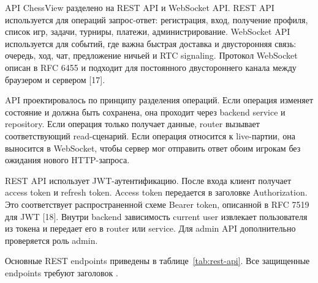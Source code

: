 API ChessView разделено на REST API и WebSocket API. REST API используется для операций запрос-ответ: регистрация, вход, получение профиля, список игр, задачи, турниры, платежи, администрирование. WebSocket API используется для событий, где важна быстрая доставка и двусторонняя связь: очередь, ход, чат, предложение ничьей и RTC signaling. Протокол WebSocket описан в RFC 6455 и подходит для постоянного двустороннего канала между браузером и сервером [17].



API проектировалось по принципу разделения операций. Если операция изменяет состояние и должна быть сохранена, она проходит через backend service и repository. Если операция только получает данные, router вызывает соответствующий read-сценарий. Если операция относится к live-партии, она выносится в WebSocket, чтобы сервер мог отправить ответ обоим игрокам без ожидания нового HTTP-запроса.

REST API использует JWT-аутентификацию. После входа клиент получает access token и refresh token. Access token передается в заголовке Authorization. Это соответствует распространенной схеме Bearer token, описанной в RFC 7519 для JWT [18]. Внутри backend зависимость current user извлекает пользователя из токена и передает его в router или service. Для admin API дополнительно проверяется роль admin.

Основные REST endpoints приведены в таблице~\ref{tab:rest-api}. Все защищенные endpoints требуют заголовок .

